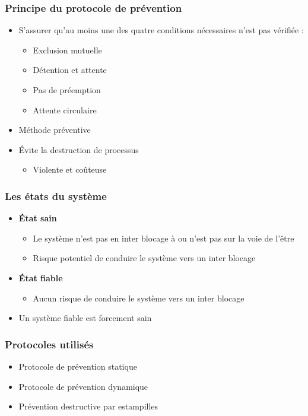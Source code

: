 \begin{frame}
\frametitle{Principe du protocole de prévention}
\begin{itemize}
\item S’assurer qu’au moins une des quatre conditions nécessaires n’est pas vérifiée :
\begin{itemize}
\item Exclusion mutuelle
\item Détention et attente
\item Pas de préemption
\item Attente circulaire
\end{itemize}
\item Méthode préventive
\item Évite la destruction de processus
\begin{itemize}
\item Violente et coûteuse
\end{itemize}
\end{itemize}
\end{frame}

\begin{frame}
\frametitle{Les états du système}
\begin{itemize}
\item <1-> \textbf{État sain}
\begin{itemize}
\item Le système n'est pas en inter blocage à ou n'est pas sur la voie de l'être
\item Risque potentiel de conduire le système vers un inter blocage
\end{itemize}
\item <2-> \textbf{État fiable}
\begin{itemize}
\item Aucun risque de conduire le système vers un inter blocage
\end{itemize}
\item <3-> Un système fiable est forcement sain
\end{itemize}
\end{frame}

\begin{frame}
\frametitle{Protocoles utilisés}
\begin{itemize}
\item Protocole de prévention statique
\item Protocole de prévention dynamique
\item Prévention destructive par estampilles
\end{itemize}
\end{frame}

